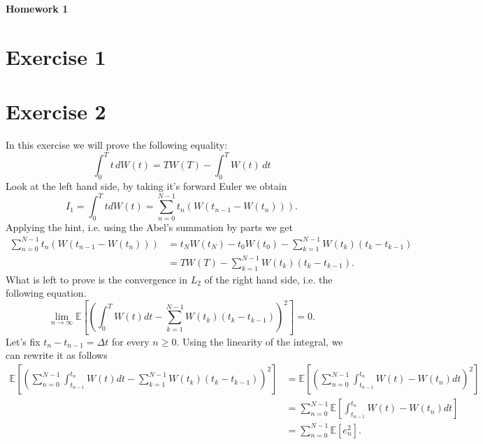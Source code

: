 \documentclass[a4paper,12pt]{article} %
\begin{document}
\begin{center} %
    {\Large \bf Homework 1}
\end{center}

\vspace{0.4cm}


\onehalfspacing
\section{Exercise 1}


\section{Exercise 2}
In this exercise we will prove the following equality:
\begin{equation}
    \int_0^T t \, dW(t) = T W(T) - \int_0^T W(t) \, dt
\end{equation}
Look at the left hand side, by taking it's forward Euler we obtain
\begin{equation}
    I_1 = \int _0^T t dW(t) = \sum_{n=0}^{N-1} t_n (W(t_{n-1} -W(t_n) )).
\end{equation}
Applying the hint, i.e. using the Abel's summation by parts we get
\begin{align*}
    \sum_{n=0}^{N-1} t_n (W(t_{n-1} -W(t_n) )) & = t_N W(t_N) - t_0 W(t_0) - \sum_{k=1}^{N-1} W(t_k) (t_k - t_{k-1}) \\
                                               & = T W(T)  - \sum_{k=1}^{N-1} W(t_k) (t_k - t_{k-1}).
\end{align*}
What is left to prove is the convergence in \(L_2\) of the right hand side, i.e. the following equation.
\begin{equation}
    \lim_{n \to \infty} \mathbb{E} \left[ \left(   \int _0^T W(t)dt-\sum_{k=1}^{N-1} W(t_k) (t_k - t_{k-1})  \right)^2\right] =0.
\end{equation}
Let's fix \(t_n - t_{n-1} = \Delta t\) for every \(n\geq 0\).
Using the linearity of the integral, we can rewrite it as follows
\begin{align*}
    \mathbb{E} \left[ \left( \sum_{n=0}^{N-1}  \int _{t_{n-1}}^{t_n} W(t)dt-\sum_{k=1}^{N-1} W(t_k) (t_k - t_{k-1}) \right) ^2  \right] & = \mathbb{E} \left[ \left(   \sum_{n=0}^{N-1}  \int _{t_{n-1}}^{t_n} W(t)-W(t_n)dt  \right)^2 \right] \\
                                                                                                                                        & =\sum_{n=0}^{N-1} \mathbb{E} \left[  \int _{t_{n-1}}^{t_n} W(t)-W(t_n) dt \right]                     \\
                                                                                                                                        & = \sum_{n=0}^{N-1} \mathbb{E} \left[  e_n ^2 \right].
\end{align*}
\end{document}
